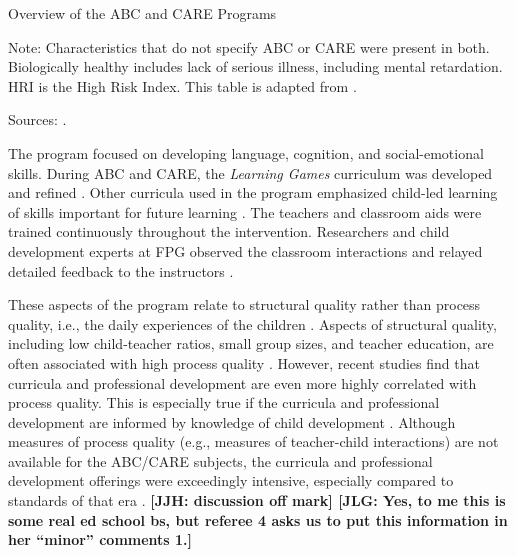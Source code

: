 \begin{table}[!htbp]
\centering
\caption{Overview of the ABC and CARE Programs}
\label{tab:abc-care-characteristics}
\begin{threeparttable}
	
\begin{tablenotes}
\footnotesize
\item Note: Characteristics that do not specify ABC or CARE were present in both. Biologically healthy includes lack of serious illness, including mental retardation. HRI is the High Risk Index. This table is adapted from \citet{Elango_Hojman_etal_2016_Early-Edu}. \\
\item Sources: \citet{Ramey_Collier_etal_1976_CarolinaAbecedarianProject,Ramey_Smith_1977_AJMD,Ramey_etal_1985_Project-CARE_TiECSE,Wasik_Ramey_etal_1990_CD,Ramey_Campbell_1991_childreninpoverty}. 
\end{tablenotes}
\end{threeparttable}
\end{table}

The program focused on developing language, cognition, and social-emotional skills. During ABC and CARE, the \textit{Learning Games} curriculum was developed and refined \citep{Sparling_Lewis_1979_BOOKLearninggamesFirstThree,Sparling_Lewis_1984_BOOKLearningGamesThreesFours}. Other curricula used in the program emphasized child-led learning of skills important for future learning \citep{Ramey_Smith_1977_AJMD, Wasik_Ramey_etal_1990_CD, Ramey_Campbell_1991_childreninpoverty}. The teachers and classroom aids were trained continuously throughout the intervention. Researchers and child development experts at FPG observed the classroom interactions and relayed detailed feedback to the instructors \citep{Ramey-etal_2012-ABC}.

These aspects of the program relate to structural quality rather than process quality, i.e., the daily experiences of the children \citep{Thomason_LaParo_2009_EED}. Aspects of structural quality, including low child-teacher ratios, small group sizes, and teacher education, are often associated with high process quality \citep{Phillipsen_etal_1997_ECRQ}. However, recent studies find that curricula and professional development are even more highly correlated with process quality. This is especially true if the curricula and professional development are informed by knowledge of child development \citep{Slot_etal_2015_Dutch_ECRQ}. Although measures of process quality (e.g., measures of teacher-child interactions) are not available for the ABC/CARE subjects, the curricula and professional development offerings were exceedingly intensive, especially compared to standards of that era \citep{Burchinal_etal_1989_CD_Daycare-Pre-K-Dev}. \textbf{[JJH: discussion off mark] [JLG: Yes, to me this is some real ed school bs, but referee 4 asks us to put this information in her ``minor'' comments 1.]}

